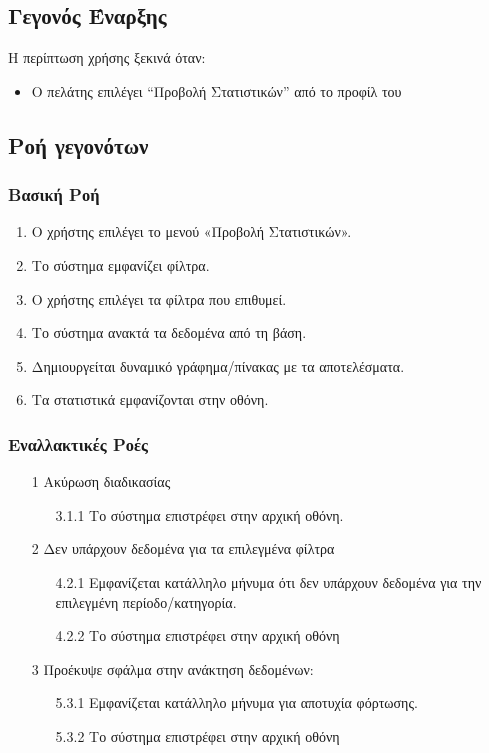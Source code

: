 \documentclass[12pt,a4paper,twoside]{book}
\begin{document}
\subsection{Γεγονός Έναρξης}
Η περίπτωση χρήσης ξεκινά όταν:
\begin{itemize}
  \item Ο πελάτης επιλέγει “Προβολή Στατιστικών” από το προφίλ του   %
\end{itemize}

\subsection{Ροή γεγονότων}

\subsubsection{Βασική Ροή}
\begin{enumerate}
  \item Ο χρήστης επιλέγει το μενού «Προβολή Στατιστικών».  %
  \item Το σύστημα εμφανίζει φίλτρα. %
  \item Ο χρήστης επιλέγει τα φίλτρα που επιθυμεί.   %
  \item Το σύστημα ανακτά τα δεδομένα από τη βάση.  %
  \item Δημιουργείται δυναμικό γράφημα/πίνακας με τα αποτελέσματα.  %
  \item Τα στατιστικά εμφανίζονται στην οθόνη. %
\end{enumerate}

\subsubsection{Εναλλακτικές Ροές}
\begin{enumerate}
  \item[1 ] Ακύρωση διαδικασίας  %
        \begin{enumerate}
          \item[3.1.1 ] Το σύστημα επιστρέφει στην αρχική οθόνη.
        \end{enumerate}
  \item[2 ] Δεν υπάρχουν δεδομένα για τα επιλεγμένα φίλτρα %
        \begin{enumerate}
          \item[4.2.1 ] Εμφανίζεται κατάλληλο μήνυμα ότι δεν υπάρχουν δεδομένα για την επιλεγμένη περίοδο/κατηγορία. %
          \item[4.2.2 ] Το σύστημα επιστρέφει στην αρχική οθόνη  %
        \end{enumerate}
  \item[3 ] Προέκυψε σφάλμα στην ανάκτηση δεδομένων: %
        \begin{enumerate}
          \item[5.3.1 ] Εμφανίζεται κατάλληλο μήνυμα για αποτυχία φόρτωσης. %
          \item[5.3.2 ] Το σύστημα επιστρέφει στην αρχική οθόνη  %
        \end{enumerate}
\end{enumerate}
\end{document}
